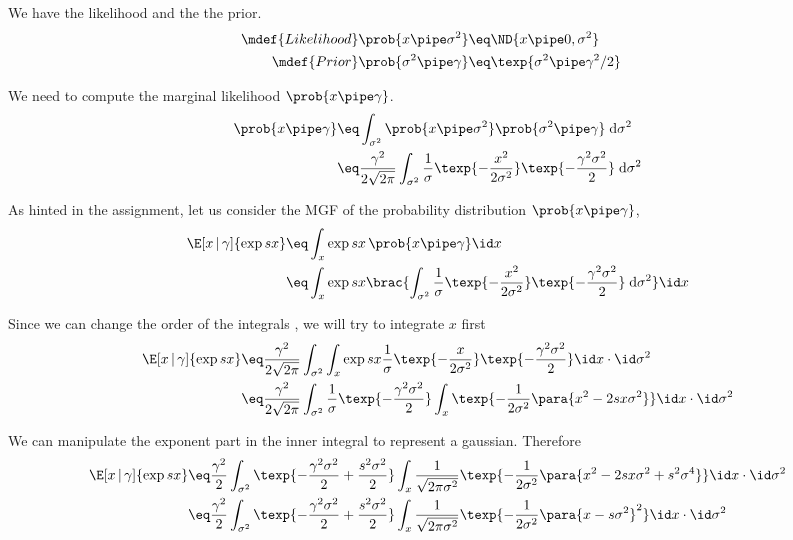 \documentclass{article}
\begin{document}
\begin{question}

	We have the likelihood and the the prior.
	\begin{align*}
		\mdef{Likelihood}	\prob{x \pipe \sigma^2}	&\eq	\ND{x \pipe 0, \sigma^2} & \\
		\mdef{Prior}	\prob{\sigma^2 \pipe \gamma}	&\eq	\texp{\sigma^2 \pipe \gamma^2 / 2} &
	\end{align*}

	We need to compute the marginal likelihood \ie $\prob{x \pipe \gamma}$.
	\begin{align*}
		\prob{x \pipe \gamma}	&\eq	\int_{\sigma^2} \prob{x \pipe \sigma^2} \prob{\sigma^2 \pipe \gamma} \; \text{d}\sigma^2 \\
		&\eq	\frac{\gamma^2}{2 \sqrt{2 \pi}} \int_{\sigma^2} \frac{1}{\sigma} \texp{- \frac{x^2}{2 \sigma^2}} \texp{- \frac{\gamma^2 \sigma^2}{2}} \; \text{d}\sigma^2
	\end{align*}

	As hinted in the assignment, let us consider the MGF of the probability distribution $\prob{x \pipe \gamma}$,
	\begin{align*}
		\E[x \,|\, \gamma]{\exp{sx}}	&\eq	\int_{x} \exp{sx}\, \prob{x \pipe \gamma} \id x \\
		&\eq	\int_{x} \exp{sx} \brac{\int_{\sigma^2} \frac{1}{\sigma} \texp{- \frac{x^2}{2 \sigma^2}} \texp{- \frac{\gamma^2 \sigma^2}{2}} \; \text{d}\sigma^2} \id x
	\end{align*}

	Since we can change the order of the integrals \cite{wiki-order-of-integration}, we will try to integrate $x$ first
	\begin{align*}
		\E[x \,|\, \gamma]{\exp{sx}}	&\eq \frac{\gamma^2}{2 \sqrt{2 \pi}} \int_{\sigma^2} \int_{x} \exp{sx} \frac{1}{\sigma} \texp{- \frac{x}{2 \sigma^2}} \texp{- \frac{\gamma^2 \sigma^2}{2}} \id x \cdot \id \sigma^2 \\
		&\eq	\frac{\gamma^2}{2 \sqrt{2 \pi}} \int_{\sigma^2} \frac{1}{\sigma} \texp{- \frac{\gamma^2 \sigma^2}{2}} \int_{x} \texp{- \frac{1}{2 \sigma^2} \para{x^2 - 2sx \sigma^2}} \id x \cdot \id \sigma^2
	\end{align*}

	We can manipulate the exponent part in the inner integral to represent a gaussian.
	Therefore
	\begin{align*}
		\E[x \,|\, \gamma]{\exp{sx}}	&\eq	\frac{\gamma^2}{2} \int_{\sigma^2} \texp{- \frac{\gamma^2 \sigma^2}{2} + \frac{s^2 \sigma^2}{2}} \int_{x} \frac{1}{\sqrt{2 \pi \sigma^2}} \texp{- \frac{1}{2 \sigma^2} \para{x^2 - 2sx \sigma^2 + s^2 \sigma^4}} \id x \cdot \id \sigma^2 \\
		&\eq	\frac{\gamma^2}{2} \int_{\sigma^2} \texp{- \frac{\gamma^2 \sigma^2}{2} + \frac{s^2 \sigma^2}{2}} \int_{x} \frac{1}{\sqrt{2 \pi \sigma^2}} \texp{- \frac{1}{2 \sigma^2} \para{x - s \sigma^2}^2} \id x \cdot \id \sigma^2\
	\end{align*}


\end{question}
\end{document}
